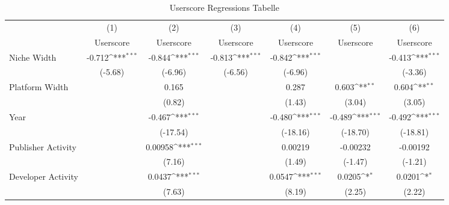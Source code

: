 \documentclass{article}
\begin{document}
\begin{table}[htbp]\centering
\def\sym#1{\ifmmode^{#1}\else\(^{#1}\)\fi}
\caption*{Userscore Regressions Tabelle\label{tab1}}
\begin{tabular}{l*{6}{c}}
\hline\hline
                    &\multicolumn{1}{c}{(1)}&\multicolumn{1}{c}{(2)}&\multicolumn{1}{c}{(3)}&\multicolumn{1}{c}{(4)}&\multicolumn{1}{c}{(5)}&\multicolumn{1}{c}{(6)}\\
                    &\multicolumn{1}{c}{Userscore}&\multicolumn{1}{c}{Userscore}&\multicolumn{1}{c}{Userscore}&\multicolumn{1}{c}{Userscore}&\multicolumn{1}{c}{Userscore}&\multicolumn{1}{c}{Userscore}\\
\hline
Niche Width         &      -0.712\sym{***}&      -0.844\sym{***}&      -0.813\sym{***}&      -0.842\sym{***}&                     &      -0.413\sym{***}\\
                    &     (-5.68)         &     (-6.96)         &     (-6.56)         &     (-6.96)         &                     &     (-3.36)         \\
[1em]
Platform Width      &                     &       0.165         &                     &       0.287         &       0.603\sym{**} &       0.604\sym{**} \\
                    &                     &      (0.82)         &                     &      (1.43)         &      (3.04)         &      (3.05)         \\
[1em]
Year                &                     &      -0.467\sym{***}&                     &      -0.480\sym{***}&      -0.489\sym{***}&      -0.492\sym{***}\\
                    &                     &    (-17.54)         &                     &    (-18.16)         &    (-18.70)         &    (-18.81)         \\
[1em]
Publisher Activity  &                     &     0.00958\sym{***}&                     &     0.00219         &    -0.00232         &    -0.00192         \\
                    &                     &      (7.16)         &                     &      (1.49)         &     (-1.47)         &     (-1.21)         \\
[1em]
Developer Activity  &                     &      0.0437\sym{***}&                     &      0.0547\sym{***}&      0.0205\sym{*}  &      0.0201\sym{*}  \\
                    &                     &      (7.63)         &                     &      (8.19)         &      (2.25)         &      (2.22)         \\

\end{tabular}
\end{table}
\end{document}
